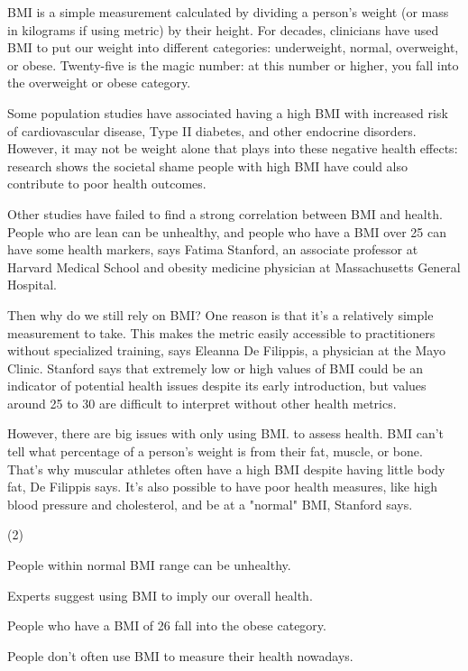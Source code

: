 \documentclass{英语试卷}
\begin{document}
\par BMI is a simple measurement calculated by dividing a person's weight (or mass in kilograms if using metric) by their height. For decades, clinicians have used BMI to put our weight into different categories: underweight, normal, overweight, or obese. Twenty-five is the magic number: at this number or higher, you fall into the overweight or obese category.\par
\par Some population studies have associated having a high BMI with increased risk of cardiovascular disease, Type II diabetes, and other endocrine disorders. However, it may not be weight alone that plays into these negative health effects: research shows the societal shame people with high BMI have could also contribute to poor health outcomes.\par
\par Other studies have failed to find a strong correlation between BMI and health. People who are lean can be unhealthy, and people who have a BMI over 25 can have some health markers, says Fatima Stanford, an associate professor at Harvard Medical School and obesity medicine physician at Massachusetts General Hospital.\par
\par Then why do we still rely on BMI? One reason is that it's a relatively simple measurement to take. This makes the metric easily accessible to practitioners without specialized training, says Eleanna De Filippis, a physician at the Mayo Clinic. Stanford says that extremely low or high values of BMI could be an indicator of potential health issues despite its early introduction, but values around 25 to 30 are difficult to interpret without other health metrics.\par
\par However, there are big issues with only using BMI. to assess health. BMI can't tell what percentage of a person's weight is from their fat, muscle, or bone. That's why muscular athletes often have a high BMI despite having little body fat, De Filippis says. It's also possible to have poor health measures, like high blood pressure and cholesterol, and be at a "normal" BMI, Stanford says.\par
{}
\begin{choices}(2)
  \item People within normal BMI range can be unhealthy.
  \item Experts suggest using BMI to imply our overall health.
  \item People who have a BMI of 26 fall into the obese category.
  \item People don't often use BMI to measure their health nowadays.
\end{choices}
\end{document}
